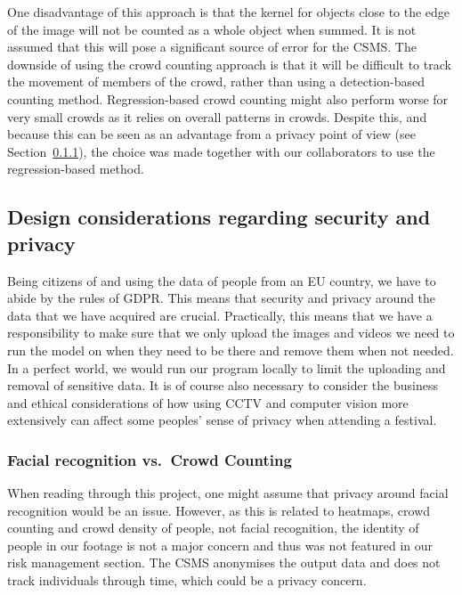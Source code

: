 \documentclass[
]{article}
\begin{document}
One disadvantage of this approach is that the kernel for objects close
to the edge of the image will not be counted as a whole object when
summed. It is not assumed that this will pose a significant source of
error for the CSMS. The downside of using the crowd counting approach is
that it will be difficult to track the movement of members of the crowd,
rather than using a detection-based counting method. Regression-based
crowd counting might also perform worse for very small crowds as it
relies on overall patterns in crowds. Despite this, and because this can
be seen as an advantage from a privacy point of view (see
Section~\ref{sec-facial-recognition}), the choice was made together with
our collaborators to use the regression-based method.

\hypertarget{design-considerations-regarding-security-and-privacy}{%
\subsection{Design considerations regarding security and
privacy}\label{design-considerations-regarding-security-and-privacy}}

Being citizens of and using the data of people from an EU country, we
have to abide by the rules of GDPR. This means that security and privacy
around the data that we have acquired are crucial. Practically, this
means that we have a responsibility to make sure that we only upload the
images and videos we need to run the model on when they need to be there
and remove them when not needed. In a perfect world, we would run our
program locally to limit the uploading and removal of sensitive data. It
is of course also necessary to consider the business and ethical
considerations of how using CCTV and computer vision more extensively
can affect some peoples' sense of privacy when attending a festival.

\hypertarget{sec-facial-recognition}{%
\subsubsection{Facial recognition vs.~Crowd
Counting}\label{sec-facial-recognition}}

When reading through this project, one might assume that privacy around
facial recognition would be an issue. However, as this is related to
heatmaps, crowd counting and crowd density of people, not facial
recognition, the identity of people in our footage is not a major
concern and thus was not featured in our risk management section. The
CSMS anonymises the output data and does not track individuals through
time, which could be a privacy concern.\\
\end{document}
